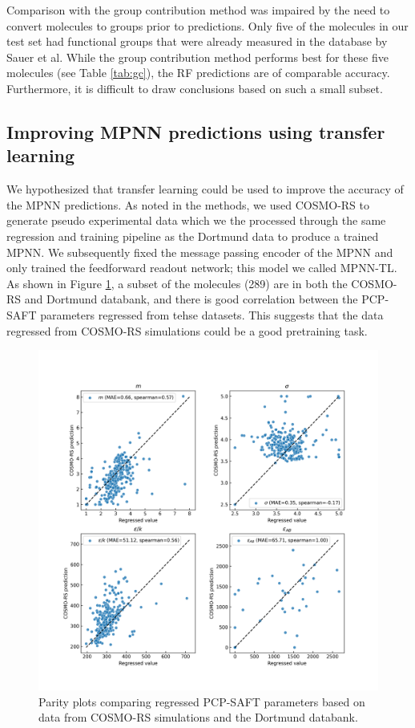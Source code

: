 Comparison with the group contribution method was impaired by the need to convert molecules to groups prior to predictions. Only five of the molecules in our test set had functional groups that were already measured in the database by Sauer et al.\cite{Sauer2014} While the group contribution method performs best for these five molecules (see Table \ref{tab:gc}), the RF predictions are of comparable accuracy. Furthermore, it is difficult to draw conclusions based on such a small subset.

\subsection{Improving MPNN predictions using transfer learning}

We hypothesized that transfer learning could be used to improve the accuracy of the MPNN predictions. As noted in the methods, we used COSMO-RS\cite{Klamt1995, Klamt2010} to generate pseudo experimental data which we the processed through the same regression and training pipeline as the Dortmund data to produce a trained MPNN. We subsequently fixed the message passing encoder of the MPNN and only trained the feedforward readout network; this model we called MPNN-TL. As shown in Figure \ref{fig:cosmo_dortmund}, a subset of the molecules (289) are in both the COSMO-RS and Dortmund databank, and there is good correlation between the PCP-SAFT parameters regressed from tehse datasets. This suggests that the data regressed from  COSMO-RS simulations could be a good pretraining task. 

\begin{figure}
    \centering
    \includegraphics[width=\textwidth]{gfx/Chapter07/cosmo_dortmund_parameter_correlations.png}
    \caption{Parity plots comparing regressed PCP-SAFT parameters based on data from COSMO-RS simulations and the Dortmund databank.}
    \label{fig:cosmo_dortmund}
\end{figure}

